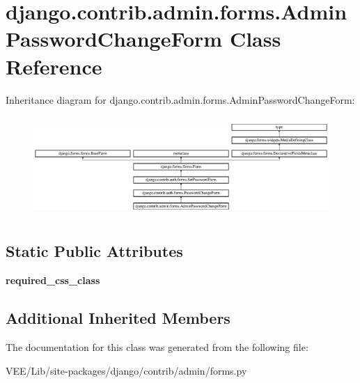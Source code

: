 \hypertarget{classdjango_1_1contrib_1_1admin_1_1forms_1_1_admin_password_change_form}{}\section{django.\+contrib.\+admin.\+forms.\+Admin\+Password\+Change\+Form Class Reference}
\label{classdjango_1_1contrib_1_1admin_1_1forms_1_1_admin_password_change_form}
Inheritance diagram for django.\+contrib.\+admin.\+forms.\+Admin\+Password\+Change\+Form\+:\begin{figure}[H]
\begin{center}
\leavevmode
\includegraphics[height=3.843138cm]{classdjango_1_1contrib_1_1admin_1_1forms_1_1_admin_password_change_form}
\end{center}
\end{figure}
\subsection*{Static Public Attributes}
\begin{DoxyCompactItemize}
\item 
\mbox{\label{classdjango_1_1contrib_1_1admin_1_1forms_1_1_admin_password_change_form_a9241028a142ec470f7ae2b0174561615}} 
{\bfseries required\+\_\+css\+\_\+class}
\end{DoxyCompactItemize}
\subsection*{Additional Inherited Members}


The documentation for this class was generated from the following file\+:\begin{DoxyCompactItemize}
\item 
V\+E\+E/\+Lib/site-\/packages/django/contrib/admin/forms.\+py\end{DoxyCompactItemize}
